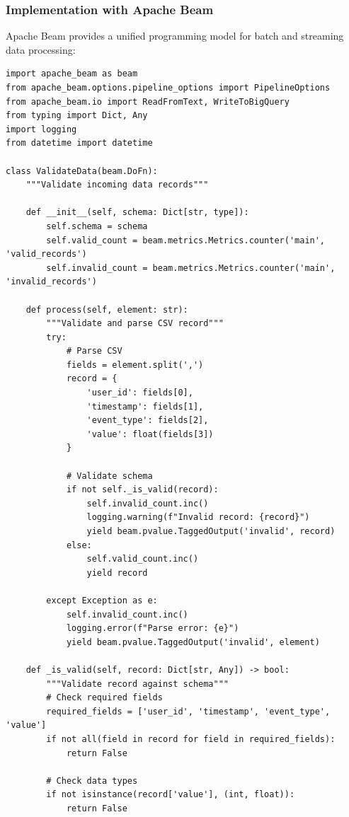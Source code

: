 \subsubsection{Implementation with Apache Beam}

Apache Beam provides a unified programming model for batch and streaming data processing:

\begin{lstlisting}[style=python, caption=Batch Data Pipeline with Apache Beam]
import apache_beam as beam
from apache_beam.options.pipeline_options import PipelineOptions
from apache_beam.io import ReadFromText, WriteToBigQuery
from typing import Dict, Any
import logging
from datetime import datetime

class ValidateData(beam.DoFn):
    """Validate incoming data records"""

    def __init__(self, schema: Dict[str, type]):
        self.schema = schema
        self.valid_count = beam.metrics.Metrics.counter('main', 'valid_records')
        self.invalid_count = beam.metrics.Metrics.counter('main', 'invalid_records')

    def process(self, element: str):
        """Validate and parse CSV record"""
        try:
            # Parse CSV
            fields = element.split(',')
            record = {
                'user_id': fields[0],
                'timestamp': fields[1],
                'event_type': fields[2],
                'value': float(fields[3])
            }

            # Validate schema
            if not self._is_valid(record):
                self.invalid_count.inc()
                logging.warning(f"Invalid record: {record}")
                yield beam.pvalue.TaggedOutput('invalid', record)
            else:
                self.valid_count.inc()
                yield record

        except Exception as e:
            self.invalid_count.inc()
            logging.error(f"Parse error: {e}")
            yield beam.pvalue.TaggedOutput('invalid', element)

    def _is_valid(self, record: Dict[str, Any]) -> bool:
        """Validate record against schema"""
        # Check required fields
        required_fields = ['user_id', 'timestamp', 'event_type', 'value']
        if not all(field in record for field in required_fields):
            return False

        # Check data types
        if not isinstance(record['value'], (int, float)):
            return False


\end{lstlisting}
